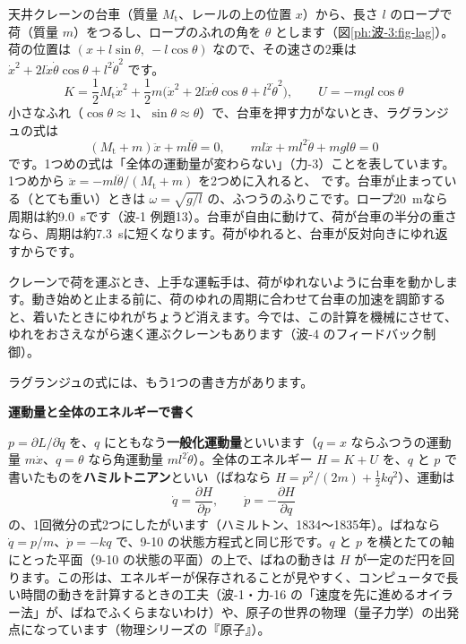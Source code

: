 天井クレーンの台車（質量 $M_{\mathrm t}$、レールの上の位置 $x$）から、長さ $l$ のロープで荷（質量 $m$）をつるし、ロープのふれの角を $\theta$ とします（図\ref{ph:波-3:fig-lag}）。荷の位置は $(x+l\sin\theta,\ -l\cos\theta)$ なので、その速さの2乗は $\dot x^2+2l\dot x\dot\theta\cos\theta+l^2\dot\theta^2$ です。
\[K=\frac12M_{\mathrm t}\dot x^2+\frac12m\bigl(\dot x^2+2l\dot x\dot\theta\cos\theta+l^2\dot\theta^2\bigr),\qquad U=-mgl\cos\theta\]
小さなふれ（$\cos\theta\approx1$、$\sin\theta\approx\theta$）で、台車を押す力がないとき、ラグランジュの式は
\[(M_{\mathrm t}+m)\ddot x+ml\ddot\theta=0,\qquad ml\ddot x+ml^2\ddot\theta+mgl\theta=0\]
です。1つめの式は「全体の運動量が変わらない」（力-3）ことを表しています。1つめから $\ddot x=-ml\ddot\theta/(M_{\mathrm t}+m)$ を2つめに入れると、
です。台車が止まっている（とても重い）ときは $\omega=\sqrt{g/l}$ の、ふつうのふりこです。ロープ\qty{20}{m}なら周期は約\qty{9.0}{s}です（波-1 例題13）。台車が自由に動けて、荷が台車の半分の重さなら、周期は約\qty{7.3}{s}に短くなります。荷がゆれると、台車が反対向きにゆれ返すからです。

\begin{phmijika}[クレーンの運転手のわざ]
クレーンで荷を運ぶとき、上手な運転手は、荷がゆれないように台車を動かします。動き始めと止まる前に、荷のゆれの周期に合わせて台車の加速を調節すると、着いたときにゆれがちょうど消えます。今では、この計算を機械にさせて、ゆれをおさえながら速く運ぶクレーンもあります（波-4 のフィードバック制御）。
\end{phmijika}

\label{ph:波-3:sec10}
ラグランジュの式には、もう1つの書き方があります。

\begin{motto}[5]
\par\addvspace{3pt}\noindent\textbf{運動量と全体のエネルギーで書く}\par\vspace{3pt}\noindent
$p=\partial L/\partial\dot q$ を、$q$ にともなう\textbf{一般化運動量}といいます（$q=x$ ならふつうの運動量 $m\dot x$、$q=\theta$ なら角運動量 $ml^2\dot\theta$）。全体のエネルギー $H=K+U$ を、$q$ と $p$ で書いたものを\textbf{ハミルトニアン}といい（ばねなら $H=p^2/(2m)+\tfrac12kq^2$）、運動は
\[\dot q=\frac{\partial H}{\partial p},\qquad\dot p=-\frac{\partial H}{\partial q}\]
の、1回微分の式2つにしたがいます（ハミルトン、1834〜1835年）。ばねなら $\dot q=p/m$、$\dot p=-kq$ で、9-10 の状態方程式と同じ形です。$q$ と $p$ を横とたての軸にとった平面（9-10 の状態の平面）の上で、ばねの動きは $H$ が一定のだ円を回ります。この形は、エネルギーが保存されることが見やすく、コンピュータで長い時間の動きを計算するときの工夫（波-1・力-16 の「速度を先に進めるオイラー法」が、ばねでふくらまないわけ）や、原子の世界の物理（量子力学）の出発点になっています（物理シリーズの『原子』）。
\end{motto}

